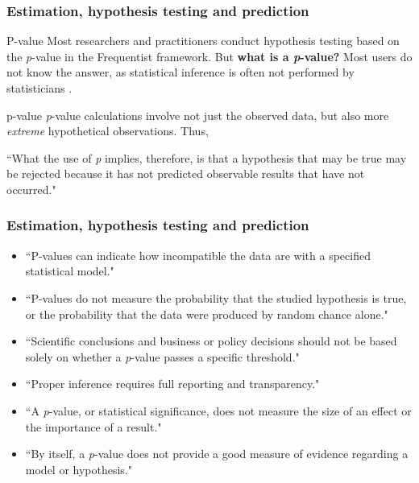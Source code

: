 \documentclass[12pt, compress]{beamer}
\begin{document}
\begin{frame}
	\frametitle{Estimation, hypothesis testing and prediction}
	\begin{block}{P-value}
		Most researchers and practitioners conduct hypothesis testing based on the \textit{p}-value in the Frequentist framework. But \textbf{what is a \textit{p}-value?} Most users do not know the answer, as statistical inference is often not performed by statisticians \citep{Berger2006}.
	\end{block}

	\begin{block}{p-value}
	\textit{p}-value calculations involve not just the observed data, but also more \textit{extreme} hypothetical observations. Thus,
	
	``What the use of \textit{p} implies, therefore, is that a hypothesis that may be true may be rejected because it has not predicted observable results that have not occurred." \cite{Jeffreys1961}
\end{block}
\end{frame}

\begin{frame}
	\frametitle{Estimation, hypothesis testing and prediction}
\begin{itemize}
	\item ``P-values can indicate how incompatible the data are with a specified statistical model."
	\item ``P-values do not measure the probability that the studied hypothesis is true, or the probability that the data were produced by random chance alone."
	\item ``Scientific conclusions and business or policy decisions should not be based solely on whether a \textit{p}-value passes a specific threshold."
	\item ``Proper inference requires full reporting and transparency."
	\item ``A \textit{p}-value, or statistical significance, does not measure the size of an effect or the importance of a result."
	\item ``By itself, a \textit{p}-value does not provide a good measure of evidence regarding a model or hypothesis."
\end{itemize}
\end{frame}
\end{document}
